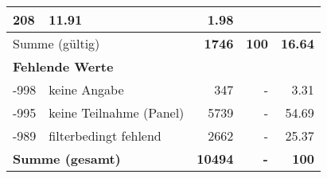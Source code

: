 \begin{longtable}{lXrrr}
       \num{208} &
       \num[round-mode=places,round-precision=2]{11,91} &
         \num[round-mode=places,round-precision=2]{1,98} \\
     \midrule
     \multicolumn{2}{l}{Summe (gültig)} &
       \textbf{\num{1746}} &
     \textbf{100} &
       \textbf{\num[round-mode=places,round-precision=2]{16,64}} \\
     \multicolumn{5}{l}{\textbf{Fehlende Werte}}\\
       -998 &
       keine Angabe &
         \num{347} &
        - &
         \num[round-mode=places,round-precision=2]{3,31} \\
       -995 &
       keine Teilnahme (Panel) &
         \num{5739} &
        - &
         \num[round-mode=places,round-precision=2]{54,69} \\
       -989 &
       filterbedingt fehlend &
         \num{2662} &
        - &
         \num[round-mode=places,round-precision=2]{25,37} \\
     \midrule
     \multicolumn{2}{l}{\textbf{Summe (gesamt)}} &
          \textbf{\num{10494}} &
        \textbf{-} &
        \textbf{100} \\
     \bottomrule
     \end{longtable}
     
